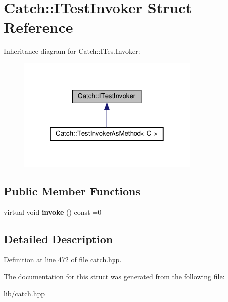 \hypertarget{structCatch_1_1ITestInvoker}{}\section{Catch\+::I\+Test\+Invoker Struct Reference}
\label{structCatch_1_1ITestInvoker}


Inheritance diagram for Catch\+::I\+Test\+Invoker\+:\nopagebreak
\begin{figure}[H]
\begin{center}
\leavevmode
\includegraphics[width=250pt]{structCatch_1_1ITestInvoker__inherit__graph}
\end{center}
\end{figure}
\subsection*{Public Member Functions}
\begin{DoxyCompactItemize}
\item 
\mbox{\label{structCatch_1_1ITestInvoker_a6fcd5c5b67d6d5ade6491ff33411ca7f}} 
virtual void {\bfseries invoke} () const =0
\end{DoxyCompactItemize}


\subsection{Detailed Description}


Definition at line \mbox{\hyperlink{catch_8hpp_source_l00472}{472}} of file \mbox{\hyperlink{catch_8hpp_source}{catch.\+hpp}}.



The documentation for this struct was generated from the following file\+:\begin{DoxyCompactItemize}
\item 
lib/catch.\+hpp\end{DoxyCompactItemize}
